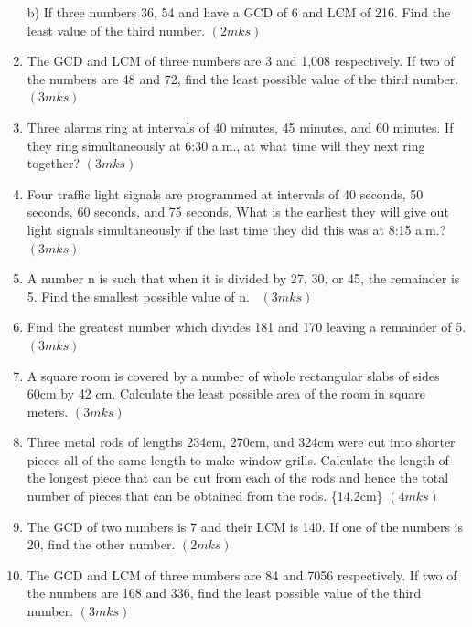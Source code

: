 \documentclass[
  letterpaper,
  DIV=11,
  numbers=noendperiod]{scrreprt}
\begin{document}
\begin{tcolorbox}
\begin{enumerate}
  b) If three numbers 36, 54 and have a GCD of 6 and LCM of 216. Find
  the least value of the third number. \hspace{11.1cm} \((2mks)\)
\item
  The GCD and LCM of three numbers are 3 and 1,008 respectively. If two
  of the numbers are 48 and 72, find the least possible value of the
  third number.\hspace{5cm} \((3mks)\)
\item
  Three alarms ring at intervals of 40 minutes, 45 minutes, and 60
  minutes. If they ring simultaneously at 6:30 a.m., at what time will
  they next ring together? \hspace{3.9cm} \((3mks)\)
\item
  Four traffic light signals are programmed at intervals of 40 seconds,
  50 seconds, 60 seconds, and 75 seconds. What is the earliest they will
  give out light signals simultaneously if the last time they did this
  was at 8:15 a.m.? \hspace{8.5cm} \((3mks)\)
\item
  A number n is such that when it is divided by 27, 30, or 45, the
  remainder is 5. Find the smallest possible value of n.~\hspace{11cm}
  \((3mks)\)
\item
  Find the greatest number which divides 181 and 170 leaving a remainder
  of 5. \hspace{1.7cm} \((3mks)\)
\item
  A square room is covered by a number of whole rectangular slabs of
  sides 60cm by 42 cm. Calculate the least possible area of the room in
  square meters. \hspace{4cm} \((3mks)\)
\item
  Three metal rods of lengths 234cm, 270cm, and 324cm were cut into
  shorter pieces all of the same length to make window grills. Calculate
  the length of the longest piece that can be cut from each of the rods
  and hence the total number of pieces that can be obtained from the
  rods. \hspace*\{14.2cm\} \((4mks)\)
\item
  The GCD of two numbers is 7 and their LCM is 140. If one of the
  numbers is 20, find the other number. \hspace{12.8cm} \((2mks)\)
\item
  The GCD and LCM of three numbers are 84 and 7056 respectively. If two
  of the numbers are 168 and 336, find the least possible value of the
  third number.\hspace{5cm} \((3mks)\)

\end{enumerate}
\end{tcolorbox}
\end{document}
